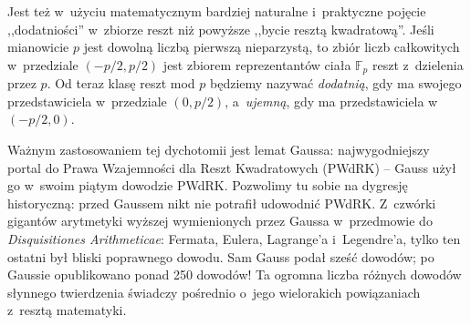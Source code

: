  Jest też w~użyciu matematycznym bardziej naturalne i~praktyczne pojęcie
 ,,dodatniości'' w~zbiorze reszt niż powyższe ,,bycie resztą
 kwadratową''. Jeśli mianowicie $p$ jest dowolną liczbą pierwszą nieparzystą, to
 zbiór liczb całkowitych w~przedziale $(-p/2,p/2)$ jest zbiorem reprezentantów
 ciała $\mathbb F_p$ reszt z~dzielenia przez $p$. Od teraz klasę reszt mod $p$ będziemy
 nazywać {\it dodatnią}, gdy ma swojego przedstawiciela w~przedziale $(0,p/2)$,
 a~{\it ujemną}, gdy ma przedstawiciela w~$(-p/2,0)$. 

Ważnym zastosowaniem tej dychotomii jest lemat Gaussa: najwygodniejszy portal do
Prawa Wzajemności dla Reszt Kwadratowych (PWdRK) -- Gauss użył go w~swoim piątym
dowodzie PWdRK. Pozwolimy tu sobie na dygresję historyczną: przed Gaussem
nikt nie potrafił udowodnić PWdRK. Z~czwórki gigantów arytmetyki wyższej
wymienionych przez Gaussa w~przedmowie do {\it Disquisitiones Arithmeticae}:
Fermata, Eulera, Lagrange'a i~Legendre'a, tylko  ten ostatni był bliski
poprawnego dowodu.  Sam Gauss podał sześć dowodów; po Gaussie opublikowano ponad
250 dowodów! Ta ogromna liczba różnych dowodów słynnego twierdzenia świadczy
pośrednio o~jego wielorakich powiązaniach z~resztą matematyki. 

